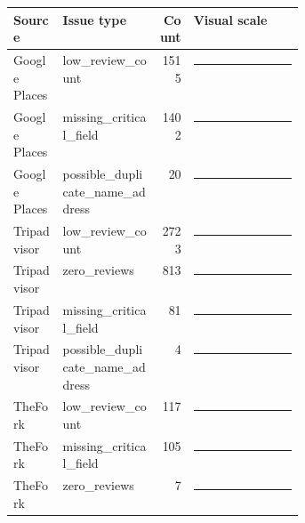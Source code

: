 {\scriptsize
\begin{tabular}{llrp{0.38\linewidth}}
\toprule
Source & Issue type & Count & Visual scale \\
\midrule
Google Places & low\_review\_count & 1515 & \textcolor{qualityorange}{\rule{27.8mm}{5pt}} \\
Google Places & missing\_critical\_field & 1402 & \textcolor{qualityorange}{\rule{25.7mm}{5pt}} \\
Google Places & possible\_duplicate\_name\_address & 20 & \textcolor{qualityorange}{\rule{0.6mm}{5pt}} \\
Tripadvisor & low\_review\_count & 2723 & \textcolor{qualityorange}{\rule{50.0mm}{5pt}} \\
Tripadvisor & zero\_reviews & 813 & \textcolor{qualityorange}{\rule{14.9mm}{5pt}} \\
Tripadvisor & missing\_critical\_field & 81 & \textcolor{qualityorange}{\rule{1.5mm}{5pt}} \\
Tripadvisor & possible\_duplicate\_name\_address & 4 & \textcolor{qualityorange}{\rule{0.6mm}{5pt}} \\
TheFork & low\_review\_count & 117 & \textcolor{qualityorange}{\rule{2.1mm}{5pt}} \\
TheFork & missing\_critical\_field & 105 & \textcolor{qualityorange}{\rule{1.9mm}{5pt}} \\
TheFork & zero\_reviews & 7 & \textcolor{qualityorange}{\rule{0.6mm}{5pt}} \\
\bottomrule
\end{tabular}
}
